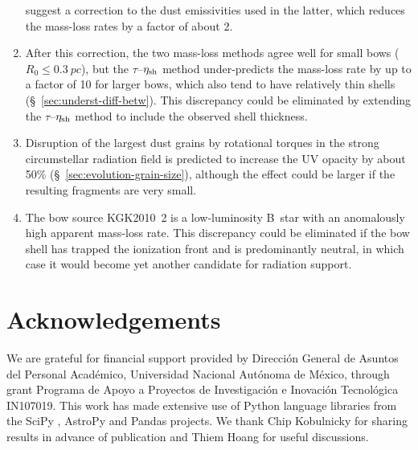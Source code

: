 \documentclass[useAMS, usenatbib, a4paper]{mnras}
\begin{document}
\begin{enumerate}[1.]
  suggest a correction to the dust emissivities used in the latter,
  which reduces the mass-loss rates by a factor of about 2.
\item After this correction, the two mass-loss methods agree well for
  small bows (\(R_0 \le \SI{0.3}{pc}\)), but the
  \(\tau\)--\(\eta_{\text{sh}}\) method under-predicts the mass-loss rate by
  up to a factor of 10 for larger bows, which also tend to have
  relatively thin shells (\S~\ref{sec:underst-diff-betw}).  This
  discrepancy could be eliminated by extending the
  \(\tau\)--\(\eta_{\text{sh}}\) method to include the observed shell
  thickness.
\item Disruption of the largest dust grains by rotational torques in
  the strong circumstellar radiation field is predicted to increase
  the UV opacity by about 50\% (\S~\ref{sec:evolution-grain-size}),
  although the effect could be larger if the resulting fragments are
  very small.
\item The bow source KGK2010~2 is a low-luminosity B~star with an
  anomalously high apparent mass-loss rate.  This discrepancy could be
  eliminated if the bow shell has trapped the ionization front and is
  predominantly neutral, in which case it would become yet another
  candidate for radiation support.
\end{enumerate}


\section*{Acknowledgements}
We are grateful for financial support provided by Dirección General de
Asuntos del Personal Académico, Universidad Nacional Autónoma de
México, through grant Programa de Apoyo a Proyectos de Investigación e
Inovación Tecnológica IN107019.  This work has made extensive use of
Python language libraries from the SciPy \citep{Jones:2001a}, AstroPy
\citep{Astropy-Collaboration:2013a, Astropy-Collaboration:2018a} and
Pandas \citep{McKinney:2010a} projects.  We thank Chip Kobulnicky for
sharing results in advance of publication and Thiem Hoang for useful
discussions.





\appendix
\end{document}
